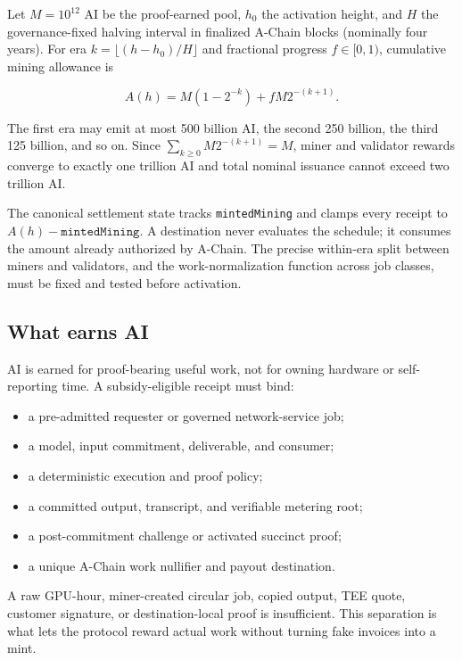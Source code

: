 Let $M=10^{12}$ AI be the proof-earned pool, $h_0$ the activation height, and
$H$ the governance-fixed halving interval in finalized A-Chain blocks
(nominally four years). For era
$k=\lfloor(h-h_0)/H\rfloor$ and fractional progress $f\in[0,1)$, cumulative
mining allowance is

\begin{equation}
  A(h)=M(1-2^{-k})+fM2^{-(k+1)}.
\end{equation}

The first era may emit at most 500 billion AI, the second 250 billion, the
third 125 billion, and so on. Since
$\sum_{k\ge0}M2^{-(k+1)}=M$, miner and validator rewards converge to exactly
one trillion AI and total nominal issuance cannot exceed two trillion AI.

The canonical settlement state tracks \texttt{mintedMining} and clamps every
receipt to $A(h)-\texttt{mintedMining}$. A destination never evaluates the
schedule; it consumes the amount already authorized by A-Chain. The precise
within-era split between miners and validators, and the work-normalization
function across job classes, must be fixed and tested before activation.

\subsection{What earns AI}

AI is earned for proof-bearing useful work, not for owning hardware or
self-reporting time. A subsidy-eligible receipt must bind:

\begin{itemize}[leftmargin=1.2em]
  \item a pre-admitted requester or governed network-service job;
  \item a model, input commitment, deliverable, and consumer;
  \item a deterministic execution and proof policy;
  \item a committed output, transcript, and verifiable metering root;
  \item a post-commitment challenge or activated succinct proof;
  \item a unique A-Chain work nullifier and payout destination.
\end{itemize}

A raw GPU-hour, miner-created circular job, copied output, TEE quote, customer
signature, or destination-local proof is insufficient. This separation is what
lets the protocol reward actual work without turning fake invoices into a mint.

